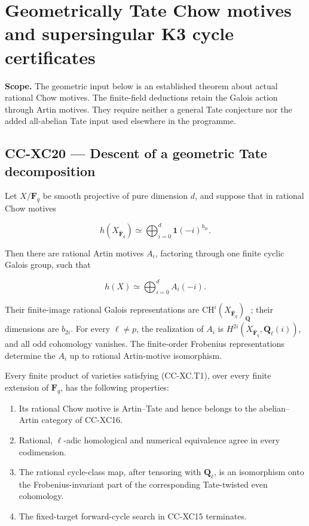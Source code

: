 \section{Geometrically Tate Chow motives and supersingular K3 cycle
certificates}\label{geometrically-tate-chow-motives-and-supersingular-k3-cycle-certificates}

\textbf{Scope.} The geometric input below is an established theorem
about actual rational Chow motives. The finite-field deductions retain
the Galois action through Artin motives. They require neither a general
Tate conjecture nor the added all-abelian Tate input used elsewhere in
the programme.

\subsection{CC-XC20 --- Descent of a geometric Tate
decomposition}\label{cc-xc20-descent-of-a-geometric-tate-decomposition}

Let \(X/\mathbf F_q\) be smooth projective of pure dimension \(d\), and
suppose that in rational Chow motives

\[
 h(X_{\bar{\mathbf F}_q})
       \simeq\bigoplus_{i=0}^{d}\mathbf 1(-i)^{b_{2i}}.
\tag{CC-XC.T1}
\]

Then there are rational Artin motives \(A_i\), factoring through one
finite cyclic Galois group, such that

\[
                  h(X)\simeq\bigoplus_{i=0}^{d} A_i(-i).
\tag{CC-XC.T2}
\]

Their finite-image rational Galois representations are
\(\mathrm{CH}^i(X_{\bar{\mathbf F}_q})_{\mathbf Q}\); their dimensions
are \(b_{2i}\). For every \(\ell\ne p\), the realization of \(A_i\) is
\(H^{2i}(X_{\bar{\mathbf F}_q},\mathbf Q_\ell(i))\), and all odd
cohomology vanishes. The finite-order Frobenius representations
determine the \(A_i\) up to rational Artin-motive isomorphism.

Every finite product of varieties satisfying (CC-XC.T1), over every
finite extension of \(\mathbf F_q\), has the following properties:

\begin{enumerate}
\def\labelenumi{\arabic{enumi}.}
\tightlist
\item
  Its rational Chow motive is Artin--Tate and hence belongs to the
  abelian--Artin category of CC-XC16.
\item
  Rational, \(\ell\)-adic homological and numerical equivalence agree in
  every codimension.
\item
  The rational cycle-class map, after tensoring with \(\mathbf Q_\ell\),
  is an isomorphism onto the Frobenius-invariant part of the
  corresponding Tate-twisted even cohomology.
\item
  The fixed-target forward-cycle search in CC-XC15 terminates.
\end{enumerate}

